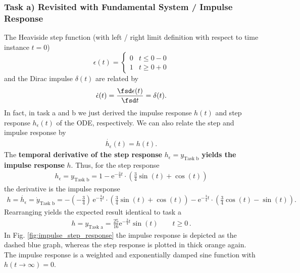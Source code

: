 \subsubsection{Task a) Revisited with Fundamental System / Impulse Response}
%
The Heaviside step function (with left / right limit definition with respect to
time instance $t=0$)
\begin{equation}
\epsilon(t) =
\begin{cases}
  0 & t\leq 0-0\\
  1 & t\geq 0+0
\end{cases}
\end{equation}
and
the Dirac impulse $\delta(t)$ are related by
\begin{align}
\dot{\epsilon}(t) = \frac{\fsd \epsilon(t)}{\fsd t} = \delta(t).
\end{align}
In fact, in task a and b we just derived the impulse response $h(t)$ and step response
$h_\epsilon(t)$ of the ODE, respectively.
%
We can also relate the step and impulse response by
\begin{align}
\dot{h_\epsilon}(t) = h(t).
\end{align}
%
The \textbf{temporal derivative of the step response} $h_\epsilon=y_\text{Task b}$
\textbf{yields the impulse response} $h$.
Thus, for the step response
\begin{align}
h_\epsilon = y_\text{Task b} =
1 - \mathrm{e}^{-\frac{3}{4} t} \cdot
\left( \frac{3}{4} \sin(t) + \cos(t)\right)
\end{align}
the derivative is the impulse response
\begin{align}
h = \dot{h_\epsilon} = \dot{y}_\text{Task b} =
 - (-\frac{3}{4})\,\mathrm{e}^{-\frac{3}{4} t} \cdot
\left( \frac{3}{4} \sin(t) + \cos(t)\right)
- \mathrm{e}^{-\frac{3}{4} t} \cdot
\left( \frac{3}{4} \cos(t) - \sin(t)\right).
\end{align}
Rearranging yields the expected result identical to task a
\begin{align}
\boxed{
h = y_\text{Task a} = \frac{25}{16} \mathrm{e}^{-\frac{3}{4} t} \sin(t) \qquad t\geq 0
}\,.
\end{align}
%
In Fig. \ref{fig:impulse_step_response} the impulse response is depicted as
the dashed blue graph, whereas the step response is plotted in thick
orange again.
The impulse response is a weighted and exponentially damped sine function
with $h(t\to\infty) = 0$.

